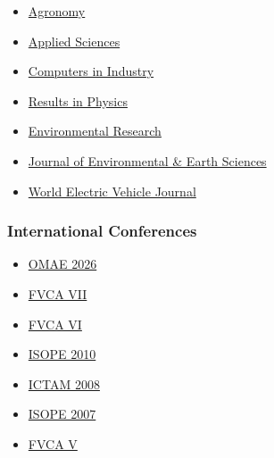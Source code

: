 \documentclass[final, a4paper, oneside, 12pt]{article}
\numberwithin{equation}{section}
\begin{document}
\begin{itemize}
    \item \href{https://www.mdpi.com/journal/agronomy/}%
    {Agronomy}

    \item \href{https://www.mdpi.com/journal/applsci/}%
    {Applied Sciences}
    
    \item \href{https://www.sciencedirect.com/journal/computers-in-industry/}%
    {Computers in Industry}

    \item \href{https://www.sciencedirect.com/journal/results-in-physics/}%
    {Results in Physics}

    \item \href{https://www.sciencedirect.com/journal/environmental-research/}%
    {Environmental Research}
    
    \item \href{https://journals.bilpubgroup.com/index.php/jees/}%
    {Journal of Environmental \& Earth Sciences}

    \item \href{https://www.mdpi.com/journal/wevj/}%
    {World Electric Vehicle Journal}
    
\end{itemize}

\subsubsection{International Conferences}

  \begin{itemize}

    \item \href{https://event.asme.org/OMAE/About/OMAE-2026/}%
    {OMAE 2026}
  
    \item \href{http://www.wias-berlin.de/workshops/fvca7/}%
    {FVCA VII}
    
    \item \href{http://fvca6.fs.cvut.cz/}%
    {FVCA VI}
    
    \item \href{http://www.isope2010.org/}%
    {ISOPE 2010}
    
    \item \href{http://ictam2008.adelaide.edu.au/}%
    {ICTAM 2008}
    
    \item \href{http://www.isope.org/conferences/conferences.htm}%
    {ISOPE 2007}
    
    \item \href{http://www.latp.univ-mrs.fr/fvca5/}%
    {FVCA V}
    
  \end{itemize}
  
\end{document}
